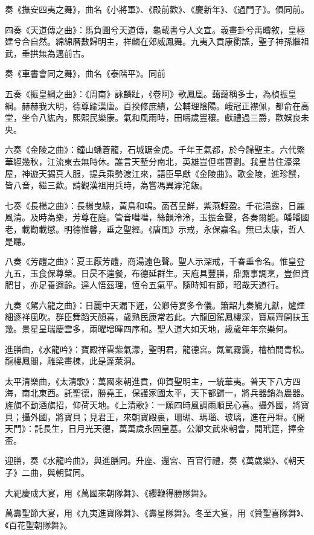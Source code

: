 奏《撫安四夷之舞》，曲名《小將軍》、《殿前歡》、《慶新年》、《過門子》。俱同前。

四奏《天道傳之曲》：馬負圖兮天道傳，龜載書兮人文宣。羲畫卦兮禹疇敘，皇極建兮合自然。綿綿曆數歸明主，祥麟在郊威鳳舞。九夷入貢康衢謠，聖子神孫繼祖武，垂拱無為邁前古。

奏《車書會同之舞》，曲名《泰階平》。同前

五奏《振皇綱之曲》：《周南》詠麟趾，《卷阿》歌鳳凰。藹藹稱多士，為楨振皇綱。赫赫我大明，德尊踰漢唐。百揆修庶績，公輔理陰陽。峨冠正襟佩，都俞在高堂，坐令八紘內，熙熙民樂康。氣和風雨時，田疇歲豐穰。獻禮過三爵，歡娛良未央。

六奏《金陵之曲》：鐘山蟠蒼龍，石城踞金虎。千年王氣都，於今歸聖主。六代繁華經幾秋，江流東去無時休。誰言天塹分南北，英雄豈但嗤曹劉。我皇昔住濠梁屋，神遊天錫真人服，提兵乘勢渡江來，語臣早獻《金陵曲》。歌金陵，進珍饌，皆八音，繼三歎。請觀漢祖用兵時，為嘗馮異滹沱飯。

七奏《長楊之曲》：長楊曳綠，黃鳥和鳴。菡萏呈鮮，紫燕輕盈。千花浥露，日麗風清。及時為樂，芳尊在庭。管音嘒嘒，絲韻泠泠，玉振金聲，各奏爾能。皤皤國老，載勸載懲。明德惟馨，垂之聖經。《唐風》示戒，永保嘉名。無已太康，哲人是聽。

八奏《芳醴之曲》：夏王厭芳醴，商湯遠色聲。聖人示深戒，千春垂令名。惟皇登九五，玉食保尊榮。日昃不遑餐，布德延群生。天庖具豐膳，鼎鼐事調烹，豈但資肥甘，亦足養遐齡。達人悟茲理，恆令五氣平。隨時知有節，昭哉天道行。

九奏《駕六龍之曲》：日麗中天漏下遲，公卿侍宴多令儀。簫韶九奏觴九獻，爐煙細逐祥風吹。群臣舞蹈天顏喜，歲熟民康常若此。六龍回駕鳳樓深，寶扇齊開扶玉幾。景星呈瑞慶雲多，兩曜增暉四序和。聖人道大如天地，歲歲年年奈樂何。

進膳曲，《水龍吟》：寶殿祥雲紫氣濛，聖明君，龍德宮。氤氳霧靄，檜柏間青松。龍樓鳳閣，雕梁畫棟，此是蓬萊洞。

太平清樂曲，《太清歌》：萬國來朝進貢，仰賀聖明主，一統華夷。普天下八方四海，南北東西。託聖德，勝堯王，保護家國太平，天下都歸一，將兵器銷為農器。旌旗不動酒旗招，仰荷天地。《上清歌》：一願四時風調雨順民心喜。攝外國，將寶貝；攝外國，將寶貝；見君王，來朝寶殿裏，珊瑚、瑪瑙、玻璃，進在丹墀。《開天門》：託長生，日月光天德，萬萬歲永固皇基。公卿文武來朝會，開玳筵，捧金盃。

迎膳，奏《水龍吟曲》，與進膳同。升座、還宮、百官行禮，奏《萬歲樂》、《朝天子》二曲，與朝賀同。

大祀慶成大宴，用《萬國來朝隊舞》、《纓鞭得勝隊舞》。

萬壽聖節大宴，用《九夷進寶隊舞》、《壽星隊舞》。冬至大宴，用《贊聖喜隊舞》、《百花聖朝隊舞》。

